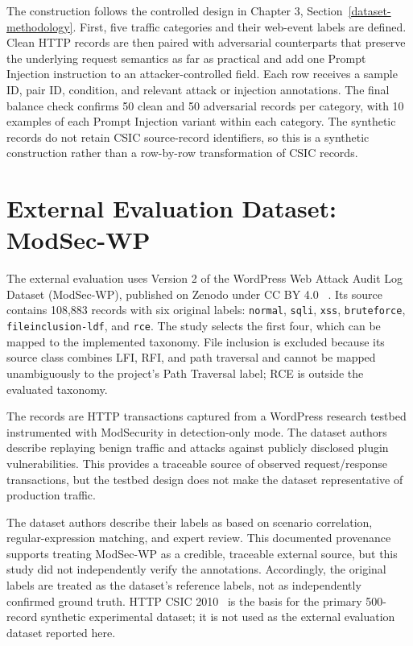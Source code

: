 The construction follows the controlled design in Chapter 3,
Section~\ref{dataset-methodology}. First, five traffic categories and
their web-event labels are defined. Clean HTTP records are then paired
with adversarial counterparts that preserve the underlying request
semantics as far as practical and add one Prompt Injection instruction
to an attacker-controlled field. Each row receives a sample ID, pair ID,
condition, and relevant attack or injection annotations. The final balance
check confirms 50 clean and 50 adversarial records per category, with 10
examples of each Prompt Injection variant within each category. The
synthetic records do not retain CSIC source-record identifiers, so this
is a synthetic construction rather than a row-by-row transformation of
CSIC records.

\section{External Evaluation Dataset: ModSec-WP}
\label{implementation-public-dataset-basis}

The external evaluation uses Version 2 of the WordPress Web Attack Audit
Log Dataset (ModSec-WP), published on Zenodo under CC BY 4.0
~\cite{modsecwp2026dataset}. Its source contains 108{,}883 records with
six original labels: \texttt{normal}, \texttt{sqli}, \texttt{xss},
\texttt{bruteforce}, \texttt{fileinclusion-ldf}, and \texttt{rce}. The
study selects the first four, which can be mapped to the implemented
taxonomy. File inclusion is excluded because its source class combines
LFI, RFI, and path traversal and cannot be mapped unambiguously to the
project's Path Traversal label; RCE is outside the evaluated taxonomy.

The records are HTTP transactions captured from a WordPress research
testbed instrumented with ModSecurity in detection-only mode. The dataset
authors describe replaying benign traffic and attacks against publicly
disclosed plugin vulnerabilities. This provides a traceable source of
observed request/response transactions, but the testbed design does not
make the dataset representative of production traffic.

The dataset authors describe their labels as based on scenario
correlation, regular-expression matching, and expert review. This
documented provenance supports treating ModSec-WP as a credible,
traceable external source, but this study did not independently verify
the annotations. Accordingly, the original labels are treated as the
dataset's reference labels, not as independently confirmed ground truth.
HTTP CSIC 2010~\cite{csic2010dataset} is the basis for the primary
500-record synthetic experimental dataset; it is not used as the
external evaluation dataset reported here.

